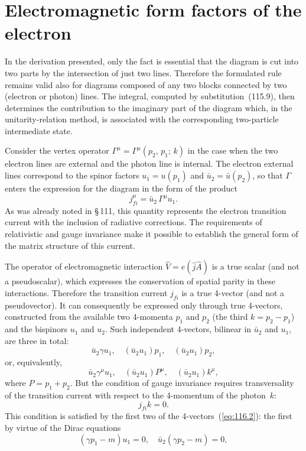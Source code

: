 
\section{Electromagnetic form factors of the electron}


In the derivation presented, only the fact is essential that the diagram is cut into two parts by the intersection of just two lines. Therefore the formulated rule remains valid also for diagrams composed of any two blocks connected by two (electron or photon) lines. The integral, computed by substitution~(115.9), then determines the contribution to the imaginary part of the diagram which, in the unitarity-relation method, is associated with the corresponding two-particle intermediate state.

\bigskip

Consider the vertex operator $\Gamma^\mu = \Gamma^\mu(p_2,\,p_1;\,k)$ in the case when the two electron lines are external and the photon line is internal. The electron external lines correspond to the spinor factors $u_1 = u(p_1)$ and $\bar{u}_2 = \bar{u}(p_2)$, so that $\Gamma$ enters the expression for the diagram in the form of the product
\begin{equation}
j_{fi}^\mu = \bar{u}_2\,\Gamma^\mu u_1.
\label{eq:116.1}
\end{equation}
As was already noted in \S\,111, this quantity represents the electron transition current with the inclusion of radiative corrections. The requirements of relativistic and gauge invariance make it possible to establish the general form of the matrix structure of this current.

The operator of electromagnetic interaction $\hat{V} = e(\hat{j}\hat{A})$ is a true scalar (and not a pseudoscalar), which expresses the conservation of spatial parity in these interactions. Therefore the transition current $j_{fi}$ is a true 4-vector (and not a pseudovector). It can consequently be expressed only through true 4-vectors, constructed from the available two 4-momenta $p_1$ and $p_2$ (the third $k = p_2 - p_1$) and the bispinors $u_1$ and $u_2$. Such independent 4-vectors, bilinear in $\bar{u}_2$ and $u_1$, are three in total:
\[
\bar{u}_2\gamma u_1, \quad (\bar{u}_2 u_1)p_1, \quad (\bar{u}_2 u_1)p_2,
\]
or, equivalently,
\begin{equation}
\bar{u}_2\gamma^\mu u_1, \quad (\bar{u}_2 u_1)P^\mu, \quad (\bar{u}_2 u_1)k^\mu,
\label{eq:116.2}
\end{equation}
where $P = p_1 + p_2$. But the condition of gauge invariance requires transversality of the transition current with respect to the 4-momentum of the photon~$k$:
\begin{equation}
j_{fi} k = 0.
\label{eq:116.3}
\end{equation}
This condition is satisfied by the first two of the 4-vectors~(\ref{eq:116.2}): the first by virtue of the Dirac equations
\begin{equation}
(\gamma p_1 - m)u_1 = 0, \quad \bar{u}_2(\gamma p_2 - m) = 0,
\label{eq:116.4}
\end{equation}


